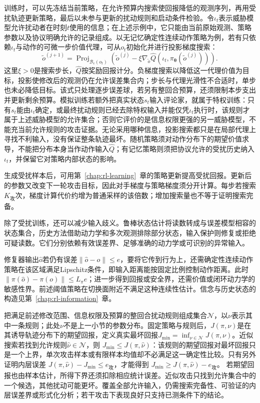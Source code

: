 训练时，可以先冻结当前策略，在允许预算内搜索使回报降低的观测序列，再用受扰轨迹更新策略，最后以未参与更新的扰动规则和启动条件检验。令$\iota_t$表示威胁模型允许扰动者在时刻$t$使用的信息；在上述示例中，它只能由当前原始观测、策略参数以及协议明确允许的记录组成。以无记忆确定性连续动作策略为例，若有只依赖$\iota_t$与动作的可微一步价值代理，可从$o_t$初始化并进行投影梯度搜索：
\[
  \widetilde o^{(j+1)}
   =\operatorname{Proj}_{\mathcal B_\epsilon(o_t)}
      \left(\widetilde o^{(j)}
       -\xi\nabla_{\widetilde o}
          \widehat Q(\iota_t,\pi_{\bm{\theta}}(\widetilde o^{(j)}))\right).
\]
这里$\xi>0$是搜索步长，$\widehat Q$按奖励回报计分。负梯度搜索以降低这一代理价值为目标，投影使修改后的观测仍在允许误差集合内；步长与代理光滑性不合适时，单步也未必降低目标。该式只处理逐步误差球，若另有整回合预算，还须限制本步支出并更新剩余预算。模拟训练若额外把真实状态$s_t$输入评论家，就属于特权训练：只有$s_t$能由$\iota_t$确定，或最终扰动规则已经去除特权输入并能仅凭$\iota_t$执行时，该规则才属于上述威胁模型的允许集合；否则它评价的是信息权限更强的另一威胁模型，不能充当前允许规则的攻击证据。无论采用哪种信息，投影搜索都只是在局部代理上寻找不利输入，没有保证整条轨迹最坏。随机策略须对动作分布下的期望价值求导，不能把分布本身当作动作输入$\widehat Q$；有记忆策略则须把协议允许的受扰历史纳入$\iota_t$，并保留它对策略内部状态的影响。

生成受扰样本后，可用第~\ref{chap:rl-learning}~章的策略更新提高受扰回报。更新后的参数又改变下一轮攻击目标，因此对手梯度与策略梯度须分开计算。每步若搜索$K_{\text{攻}}$次，梯度计算代价约增为普通采样的该倍数；增加搜索量也不等于证明搜索完备。

除了受扰训练，还可以减少输入歧义。鲁棒状态估计将读数转成与误差模型相容的状态集合，历史方法借助动力学和多次观测排除部分状态，输入保护则修复或拒绝可疑读数。它们分别依赖有效误差界、足够准确的动力学或可识别的异常输入。

修复器输出$\widehat o$若仍有误差$\|\widehat o-o\|\leq e$，要将它传到行为上，还需确定性连续动作策略在该区域满足Lipschitz条件，即输入距离能按固定比例控制动作距离。此时
$\|\pi(\widehat o)-\pi(o)\|\leq L_\pi e$；进一步得到回报或安全界，还需价值或闭环动力学的敏感性界。前述阈值策略在切换面附近不满足这种连续性估计。信念与历史状态的构造见第~\ref{chap:rl-information}~章。

把满足前述修改范围、信息权限及预算的整回合扰动规则组成集合$\mathcal N$，以$\nu$表示其中一条规则；此处$\nu$不是上一小节的参数分布。固定策略与规则后，$J(\pi,\nu)$是在其诱导轨迹分布下的期望回报，定义真实最坏回报$J_{\min}=\inf_{\nu\in\mathcal N}J(\pi,\nu)$。近似搜索若找到允许规则$\widehat\nu\in\mathcal N$，则
$J_{\min}\leq J(\pi,\widehat\nu)$：该规则的期望回报对最坏回报只是一个上界，单次攻击样本或有限样本均值却不必满足这一确定性比较。只有另外证明内层误差
$J(\pi,\widehat\nu)-J_{\min}\leq e_{\text{攻}}$，才能得到
$J_{\min}\geq J(\pi,\widehat\nu)-e_{\text{攻}}$。
若期望回报也由样本估计，所得下界还须扣除相应统计误差。近似攻击只找到允许集合中的一个候选，其他扰动可能更坏。覆盖全部允许输入，仍需搜索完备性、可验证的内层误差界或形式化分析；若干攻击下表现良好只支持已测条件下的结论。

